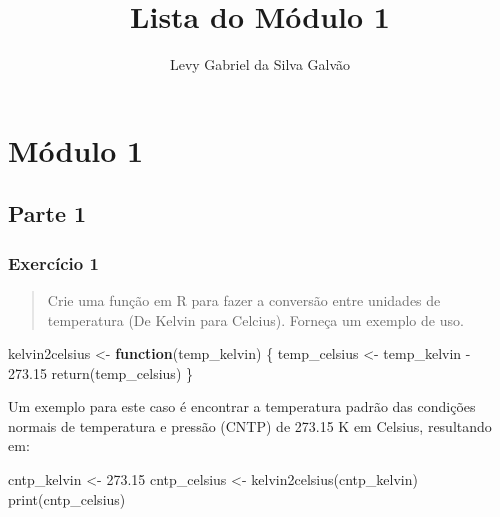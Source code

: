 \documentclass[
]{article}
\title{Lista do Módulo 1}
\author{Levy Gabriel da Silva Galvão}
\date{}
\newenvironment{Shaded}{\begin{snugshade}}{\end{snugshade}}
\newcommand{\ControlFlowTok}[1]{\textcolor[rgb]{0.13,0.29,0.53}{\textbf{#1}}}
\newcommand{\FloatTok}[1]{\textcolor[rgb]{0.00,0.00,0.81}{#1}}
\newcommand{\FunctionTok}[1]{\textcolor[rgb]{0.00,0.00,0.00}{#1}}
\newcommand{\NormalTok}[1]{#1}
\newcommand{\OtherTok}[1]{\textcolor[rgb]{0.56,0.35,0.01}{#1}}
\newcommand{\SpecialCharTok}[1]{\textcolor[rgb]{0.00,0.00,0.00}{#1}}
\begin{document}
\maketitle

{
\setcounter{tocdepth}{2}
\tableofcontents
}
\hypertarget{muxf3dulo-1}{%
\section{Módulo 1}\label{muxf3dulo-1}}

\hypertarget{parte-1}{%
\subsection{Parte 1}\label{parte-1}}

\hypertarget{exercuxedcio-1}{%
\subsubsection{Exercício 1}\label{exercuxedcio-1}}

\begin{quote}
Crie uma função em R para fazer a conversão entre unidades de
temperatura (De Kelvin para Celcius). Forneça um exemplo de uso.
\end{quote}

\begin{Shaded}
\begin{Highlighting}[]
\NormalTok{kelvin2celsius }\OtherTok{\textless{}{-}} \ControlFlowTok{function}\NormalTok{(temp\_kelvin)}
\NormalTok{\{}
\NormalTok{  temp\_celsius }\OtherTok{\textless{}{-}}\NormalTok{ temp\_kelvin }\SpecialCharTok{{-}} \FloatTok{273.15}
  \FunctionTok{return}\NormalTok{(temp\_celsius)}
\NormalTok{\}}
\end{Highlighting}
\end{Shaded}

Um exemplo para este caso é encontrar a temperatura padrão das condições
normais de temperatura e pressão (CNTP) de 273.15 K em Celsius,
resultando em:

\begin{Shaded}
\begin{Highlighting}[]
\NormalTok{cntp\_kelvin }\OtherTok{\textless{}{-}} \FloatTok{273.15}
\NormalTok{cntp\_celsius }\OtherTok{\textless{}{-}} \FunctionTok{kelvin2celsius}\NormalTok{(cntp\_kelvin)}
\FunctionTok{print}\NormalTok{(cntp\_celsius)}
\end{Highlighting}
\end{Shaded}
\end{document}
